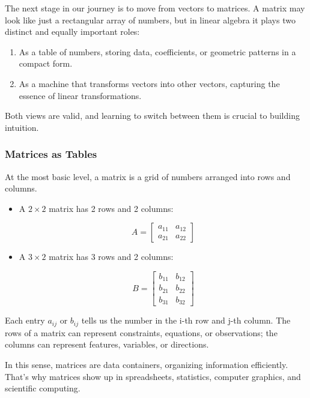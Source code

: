 \documentclass[
  letterpaper,
  DIV=11,
  numbers=noendperiod]{scrreprt}
\providecommand{\tightlist}{%
  \setlength{\itemsep}{0pt}\setlength{\parskip}{0pt}}
\begin{document}
The next stage in our journey is to move from vectors to matrices. A
matrix may look like just a rectangular array of numbers, but in linear
algebra it plays two distinct and equally important roles:

\begin{enumerate}
\def\labelenumi{\arabic{enumi}.}
\tightlist
\item
  As a table of numbers, storing data, coefficients, or geometric
  patterns in a compact form.
\item
  As a machine that transforms vectors into other vectors, capturing the
  essence of linear transformations.
\end{enumerate}

Both views are valid, and learning to switch between them is crucial to
building intuition.

\subsubsection{Matrices as Tables}\label{matrices-as-tables}

At the most basic level, a matrix is a grid of numbers arranged into
rows and columns.

\begin{itemize}
\item
  A \(2 \times 2\) matrix has 2 rows and 2 columns:

  \[
  A = \begin{bmatrix} 
  a_{11} & a_{12} \\ 
  a_{21} & a_{22} 
  \end{bmatrix}
  \]
\item
  A \(3 \times 2\) matrix has 3 rows and 2 columns:

  \[
  B = \begin{bmatrix} 
  b_{11} & b_{12} \\ 
  b_{21} & b_{22} \\ 
  b_{31} & b_{32} 
  \end{bmatrix}
  \]
\end{itemize}

Each entry \(a_{ij}\) or \(b_{ij}\) tells us the number in the i-th row
and j-th column. The rows of a matrix can represent constraints,
equations, or observations; the columns can represent features,
variables, or directions.

In this sense, matrices are data containers, organizing information
efficiently. That's why matrices show up in spreadsheets, statistics,
computer graphics, and scientific computing.
\end{document}
